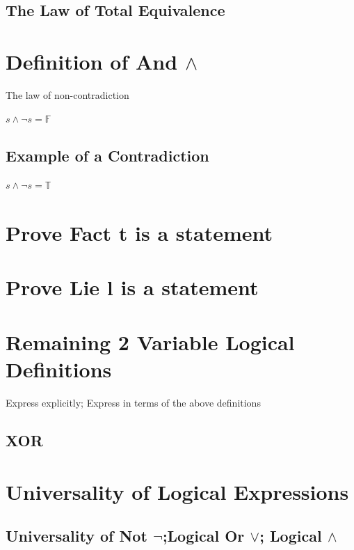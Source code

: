 \documentclass[11pt]{article}
\begin{document}
\subsection{The Law of Total Equivalence}


\section{Definition of And $\land$}
The law of non-contradiction
\begin{center}
$
s \land \lnot s = \mathbb{F}
$
\end{center}
\subsection{Example of a Contradiction}
\begin{center}
$
s \land \lnot s = \mathbb{T}
$
\end{center}








\section{Prove Fact t is a statement}
\section{Prove Lie l is a statement}





\section{Remaining 2 Variable Logical Definitions}
Express explicitly; Express in terms of the above definitions
\subsection{XOR}







\section{Universality of Logical Expressions}
\subsection{Universality of Not $\lnot$;\hspace{2mm}Logical Or $\lor$;\hspace{2mm} Logical $\land$}
\end{document}
